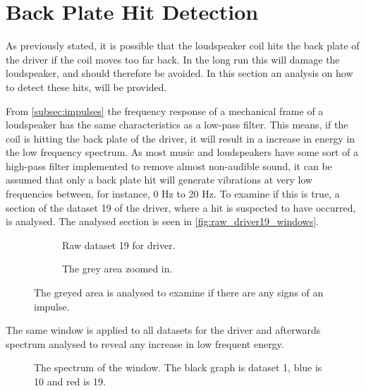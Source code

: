 \section{Back Plate Hit Detection}\label{sec:hit_detect}

As previously stated, it is possible that the loudspeaker coil hits the back plate of the driver if the coil moves too far back. In the long run this will damage the loudspeaker, and should therefore be avoided. In this section an analysis on how to detect these hits, will be provided. 

From \autoref{subsec:impulses} the frequency response of a mechanical frame of a loudspeaker has the same characteristics as a low-pass filter. This means, if the coil is hitting the back plate of the driver, it will result in a increase in energy in the low frequency spectrum. As most music and loudspeakers have some sort of a high-pass filter implemented to remove almost non-audible sound, it can be assumed that only a back plate hit will generate vibrations at very low frequencies between, for instance, 0 Hz to 20 Hz. To examine if this is true, a section of the dataset 19 of the driver, where a hit is suspected to have occurred, is analysed. The analysed section is seen in \autoref{fig:raw_driver19_windows}.


\begin{figure}[H]
\centering
\begin{subfigure}[t]{0.55\textwidth}
	
	\caption{Raw dataset 19 for driver. }
	\label{fig:raw_driver19_window}
\end{subfigure}
\begin{subfigure}[t]{0.43\textwidth}
	
	\caption{The grey area zoomed in.}
	\label{fig:raw_driver19_window_zoom}
\end{subfigure}
\caption{The greyed area is analysed to examine if there are any signs of an impulse.}
\label{fig:raw_driver19_windows}
\end{figure}

The same window is applied to all datasets for the driver and afterwards spectrum analysed to reveal any increase in low frequent energy. 

\begin{figure}[H]
\centering
{}

\label{fig:FFT_hit}
\caption{The spectrum of the window. The black graph is dataset 1, blue is 10 and red is 19.}
\label{fig:FFT_hit}
\end{figure}

